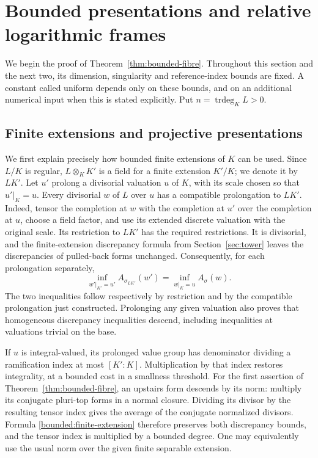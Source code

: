 \section{Bounded presentations and relative logarithmic frames}
\label{sec:bounded-presentations}

We begin the proof of Theorem~\ref{thm:bounded-fibre}.  Throughout this
section and the next two, its dimension, singularity and reference-index
bounds are fixed.  A constant called uniform depends only on these bounds,
and on an additional numerical input when this is stated explicitly.  Put
\(n=\operatorname{trdeg}_K L>0\).

\subsection{Finite extensions and projective presentations}

We first explain precisely how bounded finite extensions of \(K\) can be
used.  Since \(L/K\) is regular, \(L\otimes_K K'\) is a field for a finite
extension \(K'/K\); we denote it by \(LK'\).  Let \(u'\) prolong a divisorial
valuation \(u\) of \(K\), with its scale chosen so that \(u'|_K=u\).
Every divisorial \(w\) of \(L\) over \(u\) has a compatible prolongation
to \(LK'\).  Indeed, tensor the completion at \(w\) with the completion
at \(u'\) over the completion at \(u\), choose a field factor, and use its
extended discrete valuation with the original scale.  Its restriction to
\(LK'\) has the required restrictions.  It is divisorial, and the
finite-extension discrepancy formula from Section~\ref{sec:tower} leaves
the discrepancies of pulled-back forms unchanged.  Consequently, for
each prolongation separately,
\begin{equation}
 \inf_{w'|_{K'}=u'} A_{\sigma_{LK'}}(w')
 =\inf_{w|_K=u}A_\sigma(w).
 \label{bounded:finite-extension}
\end{equation}
The two inequalities follow respectively by restriction and by the
compatible prolongation just constructed.  Prolonging any given valuation
also proves that homogeneous discrepancy inequalities descend, including
inequalities at valuations trivial on the base.

If \(u\) is integral-valued, its prolonged value group has denominator
dividing a ramification index at most \([K':K]\).  Multiplication by that
index restores integrality, at a bounded cost in a smallness threshold.
For the first assertion of Theorem~\ref{thm:bounded-fibre}, an upstairs
form descends by its norm: multiply its conjugate pluri-top forms in a
normal closure.  Dividing its divisor by the resulting tensor index gives
the average of the conjugate normalized divisors.  Formula
\eqref{bounded:finite-extension} therefore preserves both discrepancy
bounds, and the tensor index is multiplied by a bounded degree.  One may
equivalently use the usual norm over the given finite separable extension.

